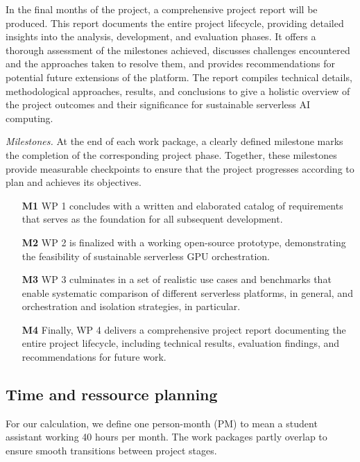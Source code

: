 In the final months of the project, a comprehensive project report will be produced.
This report documents the entire project lifecycle, providing detailed insights into the analysis, development, and evaluation phases.
It offers a thorough assessment of the milestones achieved, discusses challenges encountered and the approaches taken to resolve them, and provides recommendations for potential future extensions of the platform.
The report compiles technical details, methodological approaches, results, and conclusions to give a holistic overview of the project outcomes and their significance for sustainable serverless AI computing.

\emph{Milestones.}
At the end of each work package, a clearly defined milestone marks the completion of the corresponding project phase. 
Together, these milestones provide measurable checkpoints to ensure that the project progresses according to plan and achieves its objectives.
\begin{itemize}
    \item[\textbf{M1}] WP 1 concludes with a written and elaborated catalog of requirements that serves as the foundation for all subsequent development.
    \item[\textbf{M2}] WP 2 is finalized with a working open-source prototype, demonstrating the feasibility of sustainable serverless GPU orchestration.
    \item[\textbf{M3}] WP 3 culminates in a set of realistic use cases and benchmarks that enable systematic comparison of different serverless platforms, in general, and orchestration and isolation strategies, in particular.
    \item[\textbf{M4}] Finally, WP 4 delivers a comprehensive project report documenting the entire project lifecycle, including technical results, evaluation findings, and recommendations for future work. 
\end{itemize}

\subsection{Time and ressource planning}\label{subsec:time}

For our calculation, we define one person-month (PM) to mean a student assistant working 40 hours per month.
The work packages partly overlap to ensure smooth transitions between project stages.

